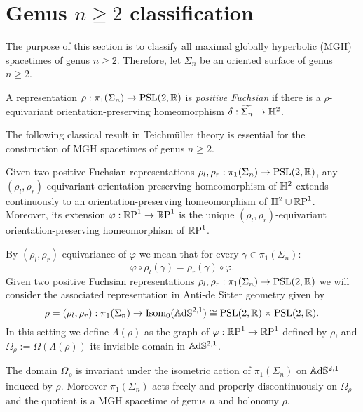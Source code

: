 \section{Genus $n\geq 2$ classification}
The purpose of this section is to classify all maximal globally hyperbolic (MGH) spacetimes of genus $n\geq 2$. Therefore, let $\Sigma_n$ be an oriented surface of genus $n\geq 2$.
\begin{definition}
    A representation $\rho: \pi_1(\Sigma_n) \to \PSL$ is \textit{positive Fuchsian} if there is a $\rho$-equivariant orientation-preserving homeomorphism $\delta : \widetilde{\Sigma_n}\to\H^2$.
\end{definition}
The following classical result in Teichm\"uller theory is essential for the construction of MGH spacetimes of genus $n\geq 2$.
\begin{lemma}
    Given two positive Fuchsian representations $\rho_l, \rho_r : \pi_1(\Sigma_n) \to \PSL$, any $(\rho_l, \rho_r)$-equivariant orientation-preserving homeomorphism of $\H^2$ extends continuously to an orientation-preserving homeomorphism of $\H^2\cup\S$. Moreover, its extension $\varphi : \S\to\S$ is the unique $(\rho_l, \rho_r)$-equivariant orientation-preserving homeomorphism of $\S$.
\end{lemma}
By $(\rho_l, \rho_r)$-equivariance of $\varphi$ we mean that for every $\gamma \in \pi_1(\Sigma_n)$:
\begin{equation} \label{eq:equivariance}
    \varphi \circ \rho_l(\gamma) = \rho_r(\gamma)\circ\varphi.
\end{equation}
Given two positive Fuchsian representations $\rho_l, \rho_r : \pi_1(\Sigma_n) \to \PSL$ we will consider the associated representation in Anti-de Sitter geometry given by
\[
    \rho = (\rho_l, \rho_r) : \pi_1(\Sigma_n) \to \text{Isom}_0(\A^{2,1}) \cong \PSL \times \PSL.
\]
In this setting we define $\Lambda(\rho)$ as the graph of $\varphi: \S\to\S$ defined by $\rho$, and $\Omega_\rho := \Omega(\Lambda(\rho))$ its invisible domain in $\A^{2,1}$.
\begin{proposition} \label{prop:MGH_example}
    The domain $\Omega_\rho$ is invariant under the isometric action of $\pi_1(\Sigma_n)$ on $\A^{2,1}$ induced by $\rho$. Moreover $\pi_1(\Sigma_n)$ acts freely and properly discontinuously on $\Omega_\rho$ and the quotient is a MGH spacetime of genus $n$ and holonomy $\rho$.
\end{proposition}
